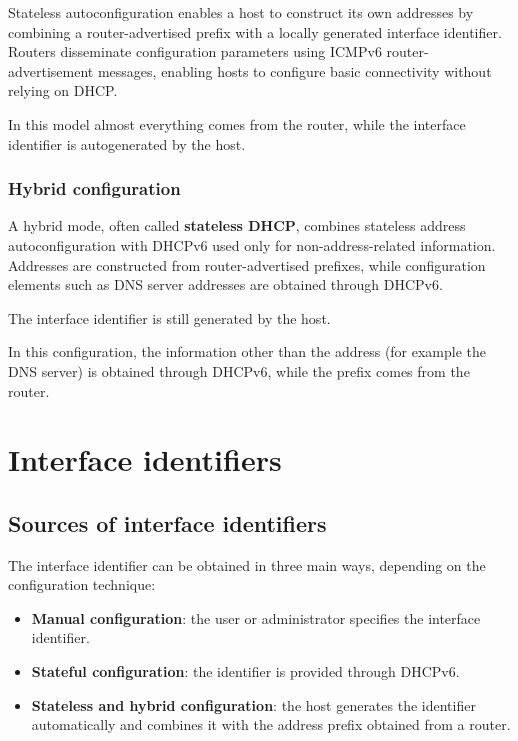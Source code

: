 \documentclass[11pt,a4paper,openany]{report}
\begin{document}
Stateless autoconfiguration enables a host to construct its own addresses by combining a router-advertised prefix with a locally generated interface identifier. Routers disseminate configuration parameters using ICMPv6 router-advertisement messages, enabling hosts to configure basic connectivity without relying on DHCP.

 In this model almost everything comes from the router, while the interface identifier is autogenerated by the host.

\subsubsection*{Hybrid configuration}

A hybrid mode, often called \textbf{stateless DHCP}, combines stateless address autoconfiguration with DHCPv6 used only for non-address-related information. Addresses are constructed from router-advertised prefixes, while configuration elements such as DNS server addresses are obtained through DHCPv6.

 The interface identifier is still generated by the host.

In this configuration, the information other than the address (for example the DNS server) is obtained through DHCPv6, while the prefix comes from the router.

\section{Interface identifiers}

\subsection{Sources of interface identifiers}

The interface identifier can be obtained in three main ways,
depending on the configuration technique:
\begin{itemize}
	\item \textbf{Manual configuration}: the user or administrator
	specifies the interface identifier.
	\item \textbf{Stateful configuration}: the identifier is provided
	through DHCPv6.
	\item \textbf{Stateless and hybrid configuration}: the host generates
	the identifier automatically and combines it with the address prefix
	obtained from a router.
\end{itemize}
\end{document}
